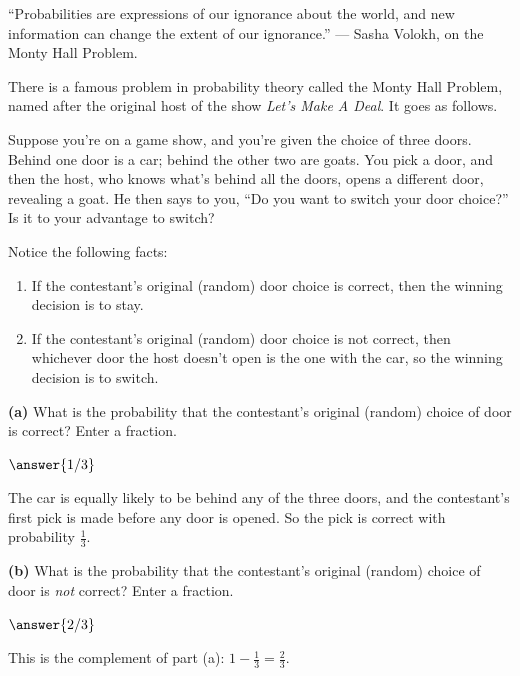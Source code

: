 \documentclass[12pt]{ximera}
\begin{document}
\begin{problem}
``Probabilities are expressions of our ignorance about the world, and new information
can change the extent of our ignorance.'' --- Sasha Volokh, on the Monty Hall Problem.

There is a famous problem in probability theory called the Monty Hall Problem, named
after the original host of the show \emph{Let's Make A Deal}. It goes as follows.

Suppose you're on a game show, and you're given the choice of three doors. Behind one
door is a car; behind the other two are goats. You pick a door, and then the host, who
knows what's behind all the doors, opens a different door, revealing a goat. He then
says to you, ``Do you want to switch your door choice?'' Is it to your advantage to
switch?

Notice the following facts:
\begin{enumerate}
\item If the contestant's original (random) door choice is correct, then the winning
      decision is to stay.
\item If the contestant's original (random) door choice is not correct, then
      whichever door the host doesn't open is the one with the car, so the winning
      decision is to switch.
\end{enumerate}

\begin{prompt}
\textbf{(a)} What is the probability that the contestant's original (random) choice of
door is correct? Enter a fraction.

$\answer{1/3}$

\begin{feedback}
The car is equally likely to be behind any of the three doors, and the contestant's
first pick is made before any door is opened. So the pick is correct with probability
$\frac13$.
\end{feedback}
\end{prompt}

\begin{prompt}
\textbf{(b)} What is the probability that the contestant's original (random) choice of
door is \emph{not} correct? Enter a fraction.

$\answer{2/3}$

\begin{feedback}
This is the complement of part (a): $1-\frac13=\frac23$.
\end{feedback}
\end{prompt}


\end{problem}
\end{document}

